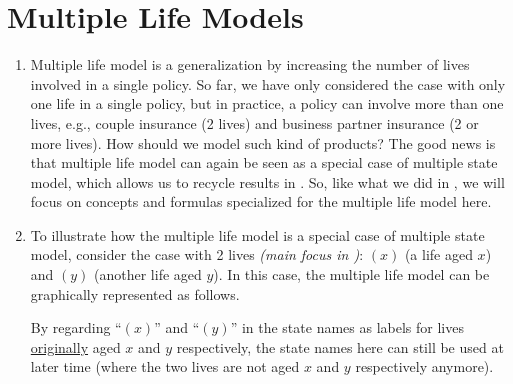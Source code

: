 \section{Multiple Life Models}
\label{sect:mult-life-models}
\begin{enumerate}
\item Multiple life model is a generalization by increasing the number of lives
involved in a single policy. So far, we have only considered the case with only
one life in a single policy, but in practice, a policy can involve more than
one lives, e.g., couple insurance (2 lives) and business partner insurance (2 or
more lives). How should we model such kind of products? The good
 news is that multiple life model can again be seen
as a special case of multiple state model, which allows us to recycle
results in . So, like what we did in
, we will focus on concepts and formulas
specialized for the multiple life model here.

\item To illustrate how the multiple life model is a special case of multiple
state model, consider the case with 2 lives \emph{(main focus in
)}: \((x)\) (a life aged \(x\)) and \((y)\)
(another life aged \(y\)). In this case, the multiple life model can be
graphically represented as follows.
\begin{center}
\end{center}
\begin{note}
By regarding ``\((x)\)'' and ``\((y)\)'' in the state names as labels for lives
\underline{originally} aged \(x\) and \(y\) respectively, the state names here
can still be used at later time (where the two lives are not aged \(x\) and
\(y\) respectively anymore).
\end{note}


\end{enumerate}

